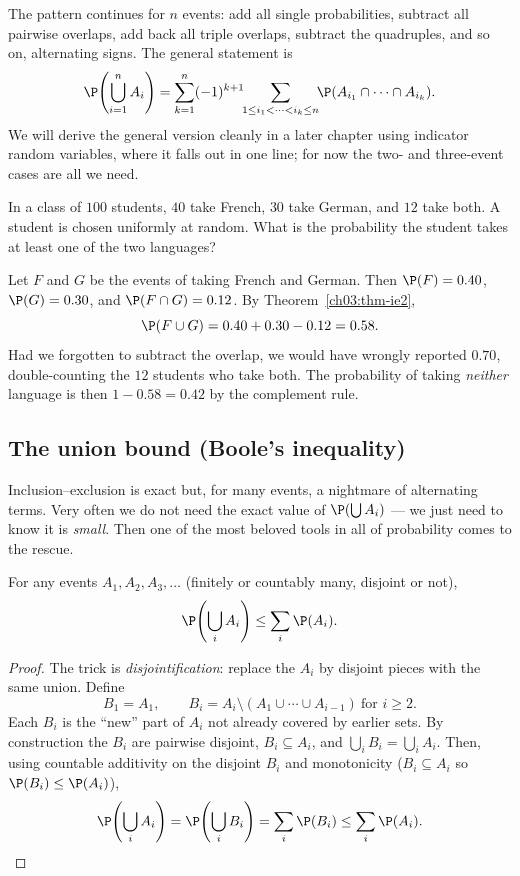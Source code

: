 The pattern continues for $n$ events: add all single probabilities, subtract all
pairwise overlaps, add back all triple overlaps, subtract the quadruples, and so
on, alternating signs. The general statement is
\[
\P\!\left(\bigcup_{i=1}^n A_i\right) = \sum_{k=1}^{n} (-1)^{k+1}
\!\!\sum_{1 \le i_1 < \cdots < i_k \le n}\!\! \P(A_{i_1} \cap \cdots \cap A_{i_k}).
\]
We will derive the general version cleanly in a later chapter using indicator
random variables, where it falls out in one line; for now the two- and
three-event cases are all we need.

\begin{example}
\label{ch03:ex-ie}
In a class of $100$ students, $40$ take French, $30$ take German, and $12$ take
both. A student is chosen uniformly at random. What is the probability the
student takes at least one of the two languages?

Let $F$ and $G$ be the events of taking French and German. Then $\P(F) = 0.40$,
$\P(G) = 0.30$, and $\P(F \cap G) = 0.12$. By Theorem~\ref{ch03:thm-ie2},
\[
\P(F \cup G) = 0.40 + 0.30 - 0.12 = 0.58.
\]
Had we forgotten to subtract the overlap, we would have wrongly reported
$0.70$, double-counting the $12$ students who take both. The probability of
taking \emph{neither} language is then $1 - 0.58 = 0.42$ by the complement rule.
\end{example}

\subsection{The union bound (Boole's inequality)}
\label{ch03:union-bound}

Inclusion--exclusion is exact but, for many events, a nightmare of alternating
terms. Very often we do not need the exact value of $\P(\bigcup A_i)$ --- we just
need to know it is \emph{small}. Then one of the most beloved tools in all of
probability comes to the rescue.

\begin{theorem}
\label{ch03:thm-union-bound}
For any events $A_1, A_2, A_3, \dots$ (finitely or countably many, disjoint or
not),
\[
\P\!\left(\bigcup_{i} A_i\right) \le \sum_{i} \P(A_i).
\]
\end{theorem}

\begin{proof}
The trick is \emph{disjointification}: replace the $A_i$ by disjoint pieces with
the same union. Define
\[
B_1 = A_1, \qquad B_i = A_i \setminus (A_1 \cup \cdots \cup A_{i-1}) \ \text{for } i \ge 2.
\]
Each $B_i$ is the ``new'' part of $A_i$ not already covered by earlier sets. By
construction the $B_i$ are pairwise disjoint, $B_i \subseteq A_i$, and
$\bigcup_i B_i = \bigcup_i A_i$. Then, using countable additivity on the disjoint
$B_i$ and monotonicity ($B_i \subseteq A_i$ so $\P(B_i) \le \P(A_i)$),
\[
\P\!\left(\bigcup_i A_i\right) = \P\!\left(\bigcup_i B_i\right) = \sum_i \P(B_i)
\le \sum_i \P(A_i). \qedhere
\]
\end{proof}

